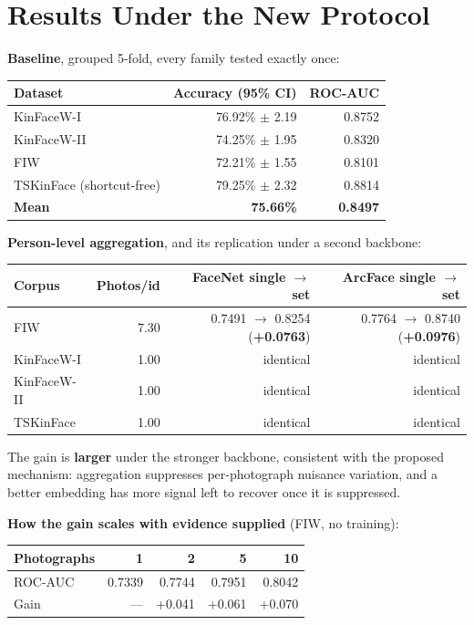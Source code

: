 \documentclass[11pt,a4paper]{article}
\begin{document}
\section*{Results Under the New Protocol}

\textbf{Baseline}, grouped 5-fold, every family tested exactly once:

\begin{center}
\small
\begin{tabular}{lrr}
\toprule
Dataset & Accuracy (95\% CI) & ROC-AUC \\
\midrule
KinFaceW-I & 76.92\% $\pm$ 2.19 & 0.8752 \\
KinFaceW-II & 74.25\% $\pm$ 1.95 & 0.8320 \\
FIW & 72.21\% $\pm$ 1.55 & 0.8101 \\
TSKinFace (shortcut-free) & 79.25\% $\pm$ 2.32 & 0.8814 \\
\textbf{Mean} & \textbf{75.66\%} & \textbf{0.8497} \\
\bottomrule
\end{tabular}
\end{center}


\textbf{Person-level aggregation}, and its replication under a second backbone:

\begin{center}
\small
\begin{tabular}{lrrr}
\toprule
Corpus & Photos/id & FaceNet single $\rightarrow$ set & ArcFace single $\rightarrow$ set \\
\midrule
FIW & 7.30 & 0.7491 $\rightarrow$ 0.8254 (\textbf{+0.0763}) & 0.7764 $\rightarrow$ 0.8740 (\textbf{+0.0976}) \\
KinFaceW-I & 1.00 & identical & identical \\
KinFaceW-II & 1.00 & identical & identical \\
TSKinFace & 1.00 & identical & identical \\
\bottomrule
\end{tabular}
\end{center}


The gain is \textbf{larger} under the stronger backbone, consistent with the proposed
mechanism: aggregation suppresses per-photograph nuisance variation, and a
better embedding has more signal left to recover once it is suppressed.

\textbf{How the gain scales with evidence supplied} (FIW, no training):

\begin{center}
\small
\begin{tabular}{lrrrr}
\toprule
Photographs & 1 & 2 & 5 & 10 \\
\midrule
ROC-AUC & 0.7339 & 0.7744 & 0.7951 & 0.8042 \\
Gain & — & +0.041 & +0.061 & +0.070 \\
\bottomrule
\end{tabular}
\end{center}
\end{document}
